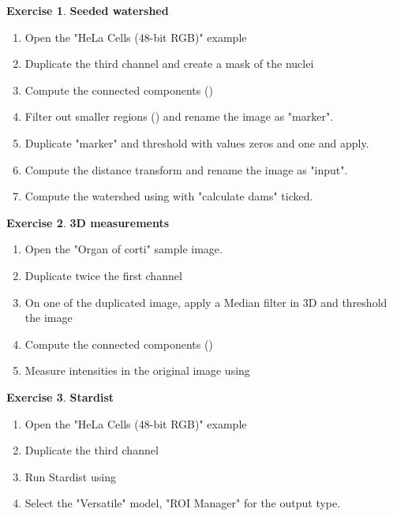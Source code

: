 \documentclass[xcolor=table,DIV=19,twocolumn,10pt]{scrartcl}
\theoremstyle{definition}
\newtheorem{exercice}{Exercise}
\begin{document}
\begin{exercice} \textbf{Seeded watershed}
  \begin{enumerate}
    \item Open the "HeLa Cells (48-bit RGB)" example
    \item Duplicate the third channel and create a mask of the nuclei
    \item Compute the connected components ()
    \item Filter out smaller regions () and rename the image as "marker".
    \item Duplicate "marker" and threshold with values zeros and one and apply.
    \item Compute the distance transform  and rename the image as "input".
    \item Compute the watershed using  with "calculate dams" ticked.
  \end{enumerate}
\end{exercice}

\begin{exercice} \textbf{3D measurements}
  \begin{enumerate}
    \item Open the "Organ of corti" sample image.
    \item Duplicate twice the first channel
    \item On one of the duplicated image, apply a Median filter in 3D and threshold the image
    \item Compute the connected components ()
    \item Measure intensities in the original image using 
  \end{enumerate}
\end{exercice}

\begin{exercice} \textbf{Stardist}
  \begin{enumerate}
    \item Open the "HeLa Cells (48-bit RGB)" example
    \item Duplicate the third channel 
    \item Run Stardist using 
    \item Select the "Versatile" model, "ROI Manager" for the output type. 
  \end{enumerate}
\end{exercice} 
\end{document}
